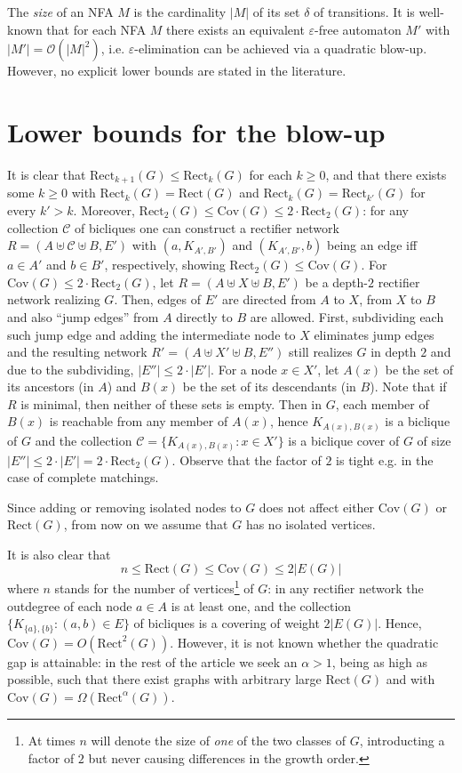 \documentclass[submission]{llncs}
\def\Cov{{\mathrm{Cov}}}
\def\Rect{{\mathrm{Rect}}}
\begin{document}
  The \emph{size} of an NFA $M$ is the cardinality $|M|$ of its set $\delta$ of transitions.
  It is well-known that for each NFA $M$ there exists an equivalent $\varepsilon$-free automaton $M'$ with $|M'|=\mathcal{O}(|M|^2)$, i.e.
  $\varepsilon$-elimination can be achieved via a quadratic blow-up. However, no explicit lower bounds are stated in the literature.
\section{Lower bounds for the blow-up}
\label{sec-gap}
  It is clear that $\Rect_{k+1}(G)\leq \Rect_k(G)$ for each $k\geq 0$, and that there exists some $k\geq 0$ with $\Rect_k(G)=\Rect(G)$ and
  $\Rect_k(G)=\Rect_{k'}(G)$ for every $k'>k$. Moreover, $\Rect_2(G)\leq \Cov(G)\leq 2\cdot\Rect_2(G)$: for any collection $\mathcal{C}$ of bicliques
  one can construct a rectifier network $R=(A\uplus\mathcal{C}\uplus B,E')$ with $(a,K_{A',B'})$ and $(K_{A',B'},b)$ being an edge iff
  $a\in A'$ and $b\in B'$, respectively, showing $\Rect_2(G)\leq \Cov(G)$. For $\Cov(G)\leq 2\cdot\Rect_2(G)$, let
  $R=(A\uplus X\uplus B,E')$ be a depth-$2$ rectifier network realizing $G$.
  Then, edges of $E'$ are directed from $A$ to $X$, from $X$ to $B$ and also ``jump edges'' from $A$ directly to $B$ are allowed.
  First, subdividing each such jump edge and adding the intermediate node to $X$ eliminates jump edges and the resulting network
  $R'=(A\uplus X'\uplus B,E'')$ still realizes $G$ in depth $2$ and due to the subdividing, $|E''|\leq 2\cdot|E'|$.
  For a node $x\in X'$, let $A(x)$ be the set of its ancestors (in $A$) and $B(x)$ be the set of its descendants (in $B$).
  Note that if $R$ is minimal, then neither of these sets is empty.
  Then in $G$, each member of $B(x)$ is reachable from any member of $A(x)$, hence $K_{A(x),B(x)}$ is a biclique of $G$ and the
  collection $\mathcal{C}=\{K_{A(x),B(x)}:x\in X'\}$ is a biclique cover of $G$ of size $|E''|\leq 2\cdot|E'|=2\cdot\Rect_2(G)$.
  Observe that the factor of $2$ is tight e.g. in the case of complete matchings.

  Since adding or removing isolated nodes to $G$ does not affect either $\Cov(G)$ or $\Rect(G)$, from now on we assume that $G$ has no isolated vertices.

  It is also clear that \[n\leq\Rect(G)\leq\Cov(G)\leq 2|E(G)|\] where $n$ stands for the number of vertices\footnote{At times $n$ will denote the size of \emph{one} of the two classes of $G$, introducting a factor of $2$ but never causing differences in the growth order.} of $G$:
  in any rectifier network the outdegree of each node $a\in A$ is at least one, and the collection $\{K_{\{a\},\{b\}}:(a,b)\in E\}$ of bicliques
  is a covering of weight $2|E(G)|$. Hence, $\Cov(G)=O(\Rect^2(G))$.
  However, it is not known whether the quadratic gap is attainable: in the rest of the article we seek an $\alpha>1$, being as high as possible,
  such that there exist graphs with arbitrary large $\Rect(G)$ and with $\Cov(G)=\Omega(\Rect^\alpha(G))$.
\end{document}
